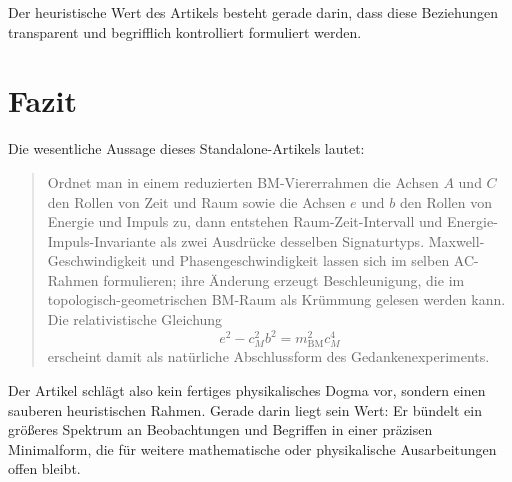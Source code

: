 \documentclass[11pt,a4paper]{article}
\theoremstyle{definition}
\theoremstyle{plain}
\begin{document}
	Der heuristische Wert des Artikels besteht gerade darin, dass diese Beziehungen transparent und begrifflich kontrolliert formuliert werden.
	
	\section{Fazit}
	
	Die wesentliche Aussage dieses Standalone-Artikels lautet:
	\begin{quote}
		Ordnet man in einem reduzierten BM-Viererrahmen die Achsen $A$ und $C$ den Rollen von Zeit und Raum sowie die Achsen $e$ und $b$ den Rollen von Energie und Impuls zu, dann entstehen Raum-Zeit-Intervall und Energie-Impuls-Invariante als zwei Ausdrücke desselben Signaturtyps. Maxwell-Geschwindigkeit und Phasengeschwindigkeit lassen sich im selben AC-Rahmen formulieren; ihre Änderung erzeugt Beschleunigung, die im topologisch-geometrischen BM-Raum als Krümmung gelesen werden kann. Die relativistische Gleichung
		\[
		e^2 - c_M^2 b^2 = m_{\mathrm{BM}}^2 c_M^4
		\]
		erscheint damit als natürliche Abschlussform des Gedankenexperiments.
	\end{quote}
	
	Der Artikel schlägt also kein fertiges physikalisches Dogma vor, sondern einen sauberen heuristischen Rahmen. Gerade darin liegt sein Wert: Er bündelt ein größeres Spektrum an Beobachtungen und Begriffen in einer präzisen Minimalform, die für weitere mathematische oder physikalische Ausarbeitungen offen bleibt.
	
\end{document}
